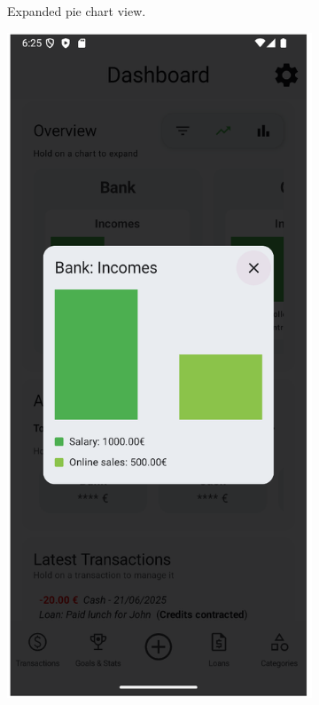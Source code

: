 \documentclass[a4paper,12pt]{article}
\begin{document}
\begin{figure}[H]
\begin{subfigure}[b]{0.23\textwidth}
        \caption{Expanded pie chart view.}
        \label{fig:dashboard_pie_expanded}
    \end{subfigure}
    \hfill
    \begin{subfigure}[b]{0.23\textwidth}
        \includegraphics[width=\textwidth]{chart_dialog_histogram.png}

\end{subfigure}
\end{figure}
\end{document}
